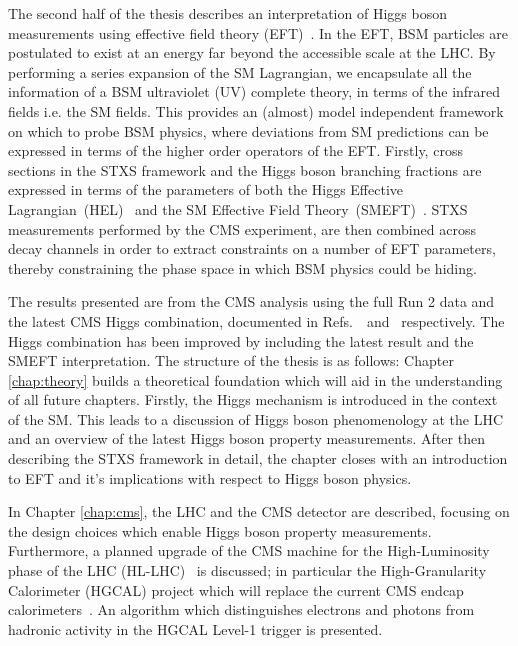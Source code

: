 The second half of the thesis describes an interpretation of Higgs boson measurements using effective field theory (EFT)~\cite{BUCHMULLER1986621,Hagiwara:1993qt,Giudice_2007,Grzadkowski2010,Contino:2013kra}. In the EFT, BSM particles are postulated to exist at an energy far beyond the accessible scale at the LHC. By performing a series expansion of the SM Lagrangian, we encapsulate all the information of a BSM ultraviolet (UV) complete theory, in terms of the infrared fields i.e. the SM fields. This provides an (almost) model independent framework on which to probe BSM physics, where deviations from SM predictions can be expressed in terms of the higher order operators of the EFT. Firstly, cross sections in the STXS framework and the Higgs boson branching fractions are expressed in terms of the parameters of both the Higgs Effective Lagrangian~(HEL)~\cite{Alloul:2013naa} and the SM Effective Field Theory~(SMEFT)~\cite{Brivio:2017vri}. STXS measurements performed by the CMS experiment, are then combined across decay channels in order to extract constraints on a number of EFT parameters, thereby constraining the phase space in which BSM physics could be hiding.

The results presented are from the CMS \Hgg analysis using the full Run 2 data and the latest CMS Higgs combination, documented in Refs.~\cite{CMS-PAS-HIG-19-015}~and~\cite{CMS-PAS-HIG-19-005} respectively. The Higgs combination has been improved by including the latest \Hgg result and the SMEFT interpretation. The structure of the thesis is as follows: Chapter {\color{blue}\ref{chap:theory}} builds a theoretical foundation which will aid in the understanding of all future chapters. Firstly, the Higgs mechanism is introduced in the context of the SM. This leads to a discussion of Higgs boson phenomenology at the LHC and an overview of the latest Higgs boson property measurements. After then describing the STXS framework in detail, the chapter closes with an introduction to EFT and it's implications with respect to Higgs boson physics.

In Chapter {\color{blue}\ref{chap:cms}}, the LHC and the CMS detector are described, focusing on the design choices which enable Higgs boson property measurements. Furthermore, a planned upgrade of the CMS machine for the High-Luminosity phase of the LHC (HL-LHC)~\cite{Contardo:2020886,ApollinariG.:2017ojx} is discussed; in particular the High-Granularity Calorimeter (HGCAL) project which will replace the current CMS endcap calorimeters~\cite{CERN-LHCC-2017-023}. An algorithm which distinguishes electrons and photons from hadronic activity in the HGCAL Level-1 trigger is presented.

